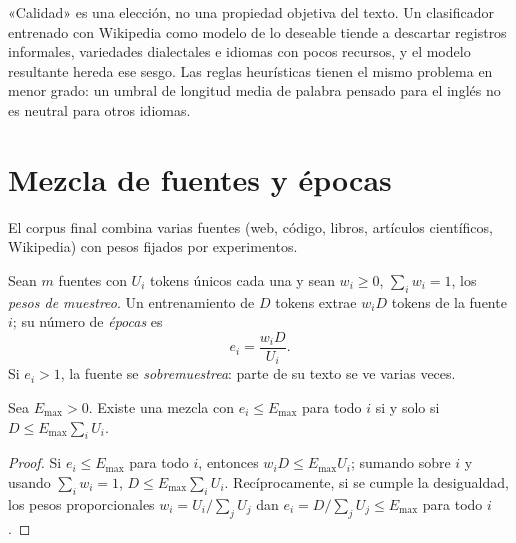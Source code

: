 \begin{observacion}
«Calidad» es una elección, no una propiedad objetiva del texto. Un clasificador entrenado con Wikipedia como modelo de lo deseable tiende a descartar registros informales, variedades dialectales e idiomas con pocos recursos, y el modelo resultante hereda ese sesgo. Las reglas heurísticas tienen el mismo problema en menor grado: un umbral de longitud media de palabra pensado para el inglés no es neutral para otros idiomas.
\end{observacion}

\section{Mezcla de fuentes y épocas}

El corpus final combina varias fuentes (web, código, libros, artículos científicos, Wikipedia) con pesos fijados por experimentos.

\begin{definicion}\label{def:mezcla}
Sean $m$ fuentes con $U_i$ tokens únicos cada una y sean $w_i\ge 0$, $\sum_i w_i=1$, los \emph{pesos de muestreo}. Un entrenamiento de $D$ tokens extrae $w_iD$ tokens de la fuente $i$; su número de \emph{épocas} es
\[
e_i=\frac{w_iD}{U_i}.
\]
Si $e_i>1$, la fuente se \emph{sobremuestrea}: parte de su texto se ve varias veces.
\end{definicion}

\begin{proposicion}\label{prop:factible}
Sea $E_{\max}>0$. Existe una mezcla con $e_i\le E_{\max}$ para todo $i$ si y solo si $D\le E_{\max}\sum_{i}U_i$.
\end{proposicion}

\begin{proof}
Si $e_i\le E_{\max}$ para todo $i$, entonces $w_iD\le E_{\max}U_i$; sumando sobre $i$ y usando $\sum_iw_i=1$, $D\le E_{\max}\sum_iU_i$. Recíprocamente, si se cumple la desigualdad, los pesos proporcionales $w_i=U_i/\sum_jU_j$ dan $e_i=D/\sum_jU_j\le E_{\max}$ para todo $i$.
\end{proof}

